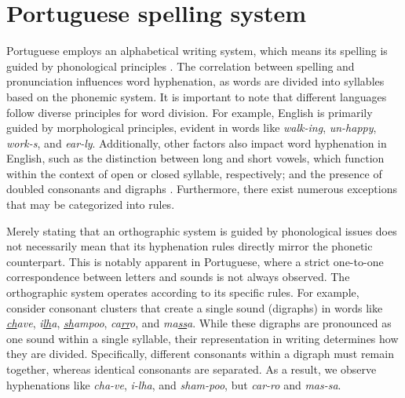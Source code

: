 \documentclass{article}
\begin{document}
\section{Portuguese spelling system}\label{sec-grammar-port}

Portuguese employs an alphabetical writing system, which means its spelling is
guided by phonological principles \parencite{cagliari2015}. The correlation between
spelling and pronunciation influences word hyphenation, as words are divided
into syllables based on the phonemic system. It is important to note that
different languages follow diverse principles for word division. For example,
English is primarily guided by morphological principles, evident in words like
\emph{walk-ing}, \emph{un-happy}, \emph{work-s}, and \emph{ear-ly}.
Additionally, other factors also impact word hyphenation in English, such as 
the distinction between long and short vowels, which function within the context
of open or closed syllable, respectively; and the presence of doubled consonants and
digraphs \parencite{lin2011,yavas2020}. 
Furthermore, there exist numerous exceptions that may be categorized into rules.

Merely stating that an orthographic system is guided by phonological issues
does not necessarily mean that its hyphenation rules directly mirror the
phonetic counterpart. This is notably apparent in Portuguese, where a strict
one-to-one correspondence between letters and sounds is not always observed.
The orthographic system operates according to its specific rules. For example,
consider consonant clusters that create a single sound (digraphs) in words like
\emph{\underline{ch}ave}, \emph{i\underline{lh}a}, \emph{\underline{sh}ampoo}, \emph{ca\underline{rr}o}, and \emph{ma\underline{ss}a}.
While these digraphs are pronounced as one sound within a single syllable,
their representation in writing determines how they are divided. Specifically,
different consonants within a digraph must remain together, whereas identical
consonants are separated. As a result, we observe hyphenations like
\emph{cha-ve}, \emph{i-lha}, and \emph{sham-poo}, but \emph{car-ro} and \emph{mas-sa}. 

\end{document}
